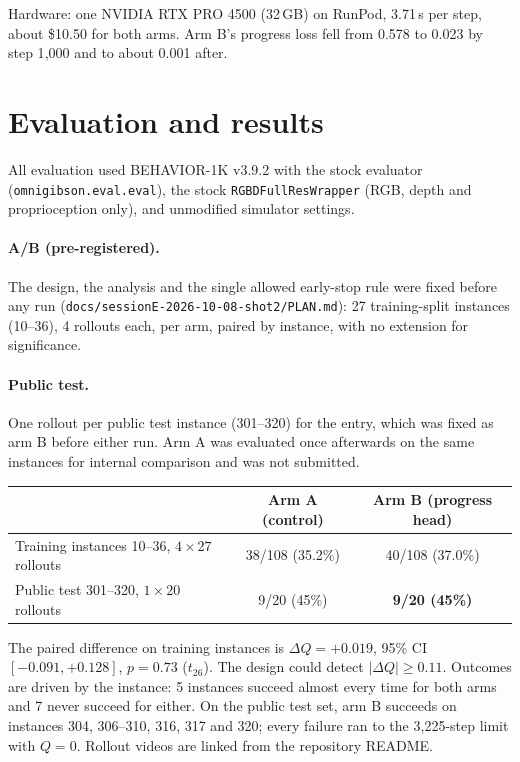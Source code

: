 \documentclass[10pt]{article}
\newcommand{\code}[1]{\texttt{#1}}
\begin{document}
Hardware: one NVIDIA RTX PRO 4500 (32\,GB) on RunPod, 3.71\,s per step, about \$10.50 for both
arms. Arm B's progress loss fell from 0.578 to 0.023 by step 1{,}000 and to about 0.001 after.

\section{Evaluation and results}

All evaluation used BEHAVIOR-1K v3.9.2 with the stock evaluator (\code{omnigibson.eval.eval}),
the stock \code{RGBDFullResWrapper} (RGB, depth and proprioception only), and unmodified
simulator settings.

\paragraph{A/B (pre-registered).}
The design, the analysis and the single allowed early-stop rule were fixed before any run
(\code{docs/sessionE-2026-10-08-shot2/PLAN.md}): 27 training-split instances (10--36),
4 rollouts each, per arm, paired by instance, with no extension for significance.

\paragraph{Public test.}
One rollout per public test instance (301--320) for the entry, which was fixed as arm B before
either run. Arm A was evaluated once afterwards on the same instances for internal comparison
and was not submitted.

\begin{center}
\begin{tabular}{lcc}
\toprule
& Arm A (control) & Arm B (progress head) \\
\midrule
Training instances 10--36, $4\times27$ rollouts & 38/108 (35.2\%) & 40/108 (37.0\%) \\
Public test 301--320, $1\times20$ rollouts & 9/20 (45\%) & \textbf{9/20 (45\%)} \\
\bottomrule
\end{tabular}
\end{center}

The paired difference on training instances is $\Delta Q = +0.019$, 95\% CI
$[-0.091, +0.128]$, $p = 0.73$ ($t_{26}$). The design could detect $|\Delta Q| \ge 0.11$.
Outcomes are driven by the instance: 5 instances succeed almost every time for both arms and
7 never succeed for either. On the public test set, arm B succeeds on instances 304, 306--310,
316, 317 and 320; every failure ran to the 3{,}225-step limit with $Q = 0$. Rollout videos are
linked from the repository README.
\end{document}
